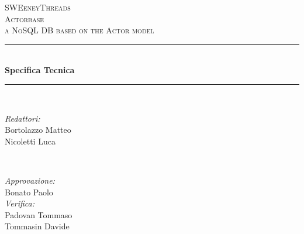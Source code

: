\documentclass[a4paper]{article}
\begin{document}
	
	\begin{titlepage}
		\newcommand{\HRule}{\rule{\linewidth}{0.5mm}} 
		\center  
		
		\textsc{\LARGE SWEeneyThreads}\\[1.5cm] 
		\textsc{\Large Actorbase}\\[0.5cm] 
		\textsc{\large a NoSQL DB based on the Actor model}\\[0.5cm]
		
		
		\HRule \\[0.4cm]
		{ \huge \bfseries Specifica Tecnica}\\[0.4cm] 
		\HRule \\[1.5cm]
		
		\begin{minipage}{0.4\textwidth}
			\begin{flushleft} \large
				\emph{Redattori:}\\
				Bortolazzo Matteo \\
				Nicoletti Luca  \\
			\end{flushleft}
		\end{minipage}
		~
		\begin{minipage}{0.4\textwidth}
			\begin{flushright} \large
				\emph{Approvazione:} \\
                    Bonato Paolo\\
				\emph{Verifica:} \\
                    Padovan Tommaso\\
                    Tommasin Davide \\
				 
			\end{flushright}
		\end{minipage}
		

\end{titlepage}
\end{document}
